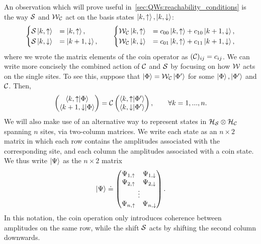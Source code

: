 An observation which will prove useful in~\cref{sec:QWs:reachability_conditions} is the way ${\mathcal{S}}$ and ${\mathcal{W}}_{\mathcal{C}}$ act on the basis states $\ket{k,\uparrow},\ket{k,\downarrow}$:
\begin{equation}
\begin{cases}
    {\mathcal{S}}\ket{k,\uparrow} &= \ket{k,\uparrow}, \\
    {\mathcal{S}}\ket{k,\downarrow} &= \ket{k+1, \downarrow},
\end{cases}
\qquad
\begin{cases}
    {\mathcal{W}}_{\mathcal{C}}\ket{k,\uparrow} &= c_{00} \ket{k,\uparrow} + c_{10} \ket{k+ 1,\downarrow}, \\
    {\mathcal{W}}_{\mathcal{C}}\ket{k,\downarrow} &= c_{01}\ket{k, \uparrow} + c_{11} \ket{k+1, \downarrow},
\end{cases}
\end{equation}
where we wrote the matrix elements of the coin operator as $({\mathcal{C}})_{ij}=c_{ij}$.
We can write more concisely the combined action of ${\mathcal{C}}$ and ${\mathcal{S}}$ by focusing on how ${\mathcal{W}}$ acts on the single sites.
To see this, suppose that $\ket{\Phi}={\mathcal{W}}_{\mathcal{C}}\ket{\Phi'}$ for some $\ket{\Phi},\ket{\Phi'}$ and ${\mathcal{C}}$.
Then,
\begin{equation}
    \begin{pmatrix}
        \braket{k,\uparrow}{\Phi} \\
        \braket{k + 1, \downarrow}{\Phi}
    \end{pmatrix} =
    {\mathcal{C}} \begin{pmatrix}
        \braket{k,\uparrow}{\Phi'} \\
        \braket{k,\downarrow}{\Phi'}
    \end{pmatrix},
    \qquad \forall k=1,...,n.
    \label{eq:QWs:dynamics_on_single_positions}
\end{equation}
We will also make use of an alternative way to represent states in ${{\mathcal{H}}_{\mathcal{S}}}\otimes{{\mathcal{H}}_{\mathcal{C}}}$ spanning $n$ sites, via two-column matrices. We write each state as an $n\times 2$ matrix in which each row contains the amplitudes associated with the corresponding site, and each column the amplitudes associated with a coin state.
We thus write $\ket\Psi$ as the $n\times2$ matrix
\begin{equation}
    \ket\Psi\doteq \begin{pmatrix}
        \Psi_{1,\uparrow} & \Psi_{1,\downarrow} \\
        \Psi_{2,\uparrow} & \Psi_{2,\downarrow} \\
        \multicolumn{2}{c}{\vdots} \\ 
        \Psi_{n,\uparrow} & \Psi_{n,\downarrow} \\
    \end{pmatrix}.
    \label{eq:QWs:matrix_notation}
\end{equation}
In this notation, the coin operation only introduces coherence between amplitudes on the same row, while the shift ${\mathcal{S}}$ acts by shifting the second column downwards.

